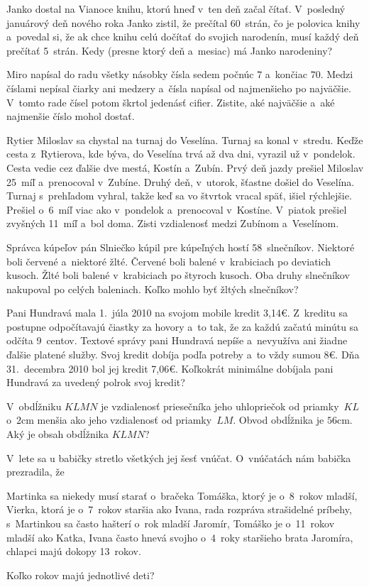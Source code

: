 {%
Janko dostal na Vianoce knihu, ktorú hneď v~ten deň začal čítať. V~posledný januárový deň nového roka Janko zistil, že prečítal 60~strán, čo je polovica knihy a~povedal si, že ak chce knihu celú dočítať do svojich narodenín, musí každý deň prečítať 5~strán. Kedy (presne ktorý deň a~mesiac) má Janko narodeniny?
}

{%
Miro napísal do radu všetky násobky čísla sedem počnúc $7$
a~končiac $70$. Medzi číslami nepísal čiarky ani medzery a~čísla napísal
od najmenšieho po najväčšie. V~tomto rade čísel potom škrtol jedenásť cifier. Zistite,
aké najväčšie a~aké najmenšie číslo mohol dostať.
}

{%
Rytier Miloslav sa chystal na turnaj do Veselína. Turnaj sa konal v~stredu.
Keďže cesta z~Rytierova, kde býva, do Veselína trvá až dva dni,
vyrazil už v~pondelok. Cesta vedie cez ďalšie dve mestá, Kostín a~Zubín.
Prvý deň jazdy prešiel Miloslav 25~míľ a~prenocoval v~Zubíne. Druhý deň, v~utorok, šťastne došiel do Veselína. Turnaj s~prehľadom
vyhral, takže keď sa vo štvrtok vracal späť, išiel rýchlejšie. Prešiel o~6~míľ
viac ako v~pondelok a~prenocoval v~Kostíne. V~piatok prešiel zvyšných 11~míľ
a~bol doma. Zisti vzdialenosť medzi Zubínom a~Veselínom.
}

{%
Správca kúpeľov pán Slniečko kúpil pre kúpeľných hostí 58~slnečníkov.
Niektoré boli červené a~niektoré žlté. Červené boli balené v~krabiciach
po deviatich kusoch. Žlté boli balené v~krabiciach po štyroch kusoch.
Oba druhy slnečníkov nakupoval po celých baleniach. Koľko mohlo byť žltých slnečníkov?
}

{%
Pani Hundravá mala 1.~júla 2010 na svojom mobile kredit 3{,}14€.
Z~kreditu sa postupne odpočítavajú čiastky za hovory a~to tak, že za každú
začatú minútu sa odčíta 9~centov. Textové správy pani Hundravá nepíše a~nevyužíva ani žiadne ďalšie platené služby. Svoj kredit dobíja podľa potreby a~to vždy sumou 8€. Dňa 31.~decembra 2010 bol jej kredit 7{,}06€. Koľkokrát minimálne dobíjala pani Hundravá za uvedený polrok svoj kredit?}

{%
V~obdĺžniku $KLMN$ je vzdialenosť priesečníka jeho uhlopriečok od priamky~$KL$ o~$2\text{cm}$  menšia ako
jeho vzdialenosť od priamky~$LM$. Obvod obdĺžnika je $56\text{cm}$. Aký je obsah obdĺžnika $KLMN$?}

{%
V~lete sa u babičky stretlo všetkých jej šesť vnúčat. O~vnúčatách nám babička prezradila, že
\begin{itemize}
  \iitem Martinka sa niekedy musí starať o~bračeka Tomáška, ktorý je o~8~rokov mladší,
  \iitem Vierka, ktorá je o~7~rokov staršia ako Ivana, rada rozpráva strašidelné príbehy,
  \iitem s~Martinkou sa často hašterí o~rok mladší Jaromír,
  \iitem Tomáško je o~11~rokov mladší ako Katka,
  \iitem Ivana často hnevá svojho o~4~roky staršieho brata Jaromíra,
  \iitem chlapci majú dokopy 13~rokov.
\end{itemize}
Koľko rokov majú jednotlivé deti?}

